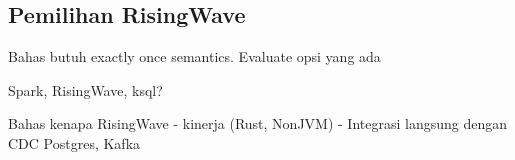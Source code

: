 \subsection{Pemilihan RisingWave}

Bahas butuh exactly once semantics. Evaluate opsi yang ada

Spark, RisingWave, ksql?

Bahas kenapa RisingWave
- kinerja (Rust, NonJVM)
- Integrasi langsung dengan CDC Postgres, Kafka